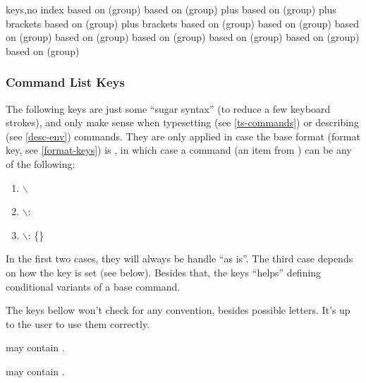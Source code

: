 \documentclass{article}
\begin{document}
\begin{describelist*}{keys,no index}
   {based on (group) }
   {based on (group)  plus }
   {based on (group)  plus brackets}
   {based on (group)  plus brackets}
   {based on (group) }
   {based on (group) }
   {based on (group) }
   {based on (group) }
   {based on (group) }
   {based on (group) }
    {based on (group) }
    {based on (group) }
\end{describelist*}

  
\subsubsection{Command List Keys}\label{code:keys}
The following keys are just some ``sugar syntax'' (to reduce a few keyboard strokes), and only make sense when typesetting (see \ref{ts-commands}) or describing (see \ref{desc-env})  commands. They are only applied in case the base format (format key, see \ref{format-keys}) is , in which case a command (an item from ) can be any of the following:
\begin{enumerate}[midsep]
  \item $\backslash$
  \item $\backslash$:
  \item $\backslash$:  \{\}
\end{enumerate}

In the first two cases, they will always be handle  ``as is''. The third case depends on how the key  is set (see below). Besides that, the keys  ``helps'' defining conditional variants of a base command.
  \begin{tsremark}
    The keys bellow won't check for any  convention, besides possible letters. It's up to the user to use them correctly.

     may contain . 
    
     may contain . 
  \end{tsremark}
\end{document}
